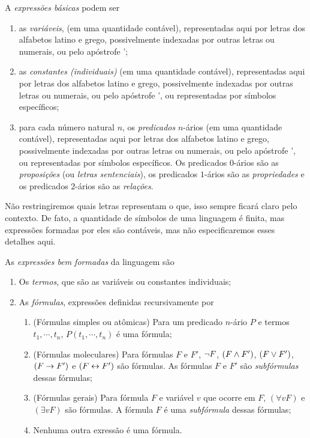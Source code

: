 A \emph{expressões básicas} podem ser
	\begin{enumerate}
	\item as \emph{variáveis}, (em uma quantidade contável), representadas aqui por letras dos alfabetos latino e grego, possivelmente indexadas por outras letras ou numerais, ou pelo apóstrofe ';
	
	\item as \emph{constantes (individuais)} (em uma quantidade contável), representadas aqui por letras dos alfabetos latino e grego, possivelmente indexadas por outras letras ou numerais, ou pelo apóstrofe ', ou representadas por símbolos específicos;
	
	\item para cada número natural $n$, os \emph{predicados} $n$-ários (em uma quantidade contável), representadas aqui por letras dos alfabetos latino e grego, possivelmente indexadas por outras letras ou numerais, ou pelo apóstrofe ', ou representadas por símbolos específicos. Os predicados $0$-ários são as \emph{proposições} (ou \emph{letras sentenciais}), os predicados $1$-ários são as \emph{propriedades} e os predicados $2$-ários são as \emph{relações}.
	\end{enumerate}

Não restringiremos quais letras representam o que, isso sempre ficará claro pelo contexto. De fato, a quantidade de símbolos de uma linguagem é finita, mas expressões formadas por eles são contáveis, mas não especificaremos esses detalhes aqui.

As \emph{expressões bem formadas} da linguagem são
	\begin{enumerate}
	\item Os \emph{termos}, que são as variáveis ou constantes individuais;
	
	\item As \emph{fórmulas}, expressões definidas recursivamente por
		\begin{enumerate}
		\item (Fórmulas simples ou atômicas) Para um predicado $n$-ário $P$ e termos $t_1, \cdots, t_n$, $P(t_1,\cdots,t_n)$ é uma fórmula;
		
		\item (Fórmulas moleculares) Para fórmulas $F$ e $F'$, $\lnot F$, $(F \land F')$, $(F \lor F')$, $(F \rightarrow F')$ e $(F \leftrightarrow F')$ são fórmulas. As fórmulas $F$ e $F'$ são \emph{subfórmulas} dessas fórmulas;
		
		\item (Fórmulas gerais) Para fórmula $F$ e variável $v$ que ocorre em $F$, $(\forall v F)$ e $(\exists v F)$ são fórmulas. A fórmula $F$ é uma \emph{subfórmula} dessas fórmulas;
		
		\item Nenhuma outra exressão é uma fórmula.
		\end{enumerate}
	\end{enumerate}

